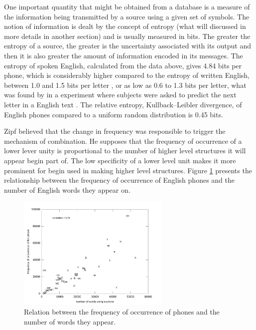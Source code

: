 One important quantity that might be obtained from a database is a measure of the information
being transmitted by a source using a given set of symbols. The notion of information
is dealt by the concept of entropy (what will discussed in more details in another section)
and is usually measured in bits. The greater the entropy of a source, the greater is the 
uncertainty associated with its output and then it is also greater the amount of information encoded
in its messages.
The entropy of spoken English, calculated from the data above, gives 4.84 bits per phone, 
which is considerably higher compared to the entropy of written English,
between 1.0 and 1.5 bits per letter \citep{schneier1996}, or as low as 0.6 to 1.3 bits per letter,
what was found by \cite{shannon1951} in a experiment where subjects were asked to predict
the next letter in a English text . 
The relative entropy, Kullback–Leibler divergence, of English 
phones compared to a uniform random distribution is 0.45 bits.

Zipf believed that the change in frequency was responsible to trigger the 
mechanism of combination. He supposes that the frequency of occurrence of a
lower lever unity is proportional to the number of higher level structures 
it will appear begin part of. The low specificity of a lower level unit
makes it more prominent for begin used in making higher level structures.
Figure \ref{fig:phones_num_words_freq_occ} presents the relationship
between the frequency of occurrence of English phones and the number
of English words they appear on. 

\begin{figure}[h!]
\centering
\includegraphics[width=0.65\textwidth]{images/phones_num_words_freq_occ.pdf}
\caption{Relation between the frequency of occurrence of phones and the number of words they appear.}
\label{fig:phones_num_words_freq_occ}
\end{figure} 

